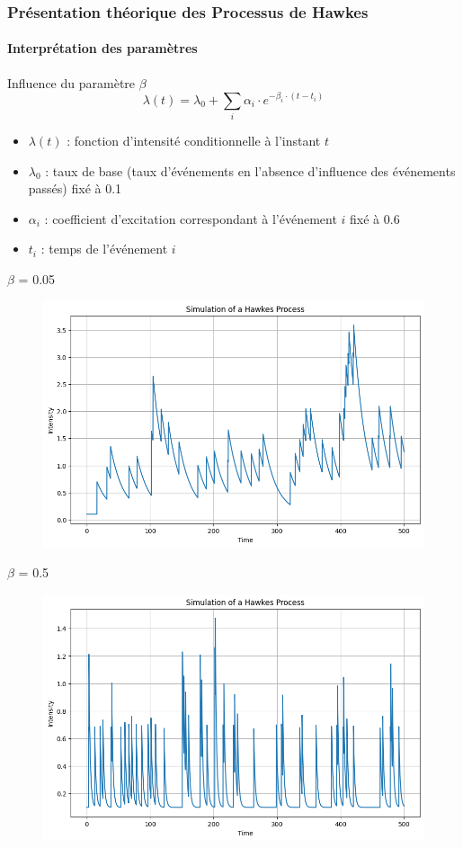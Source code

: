 \begin{frame}
    \frametitle{Présentation théorique des Processus de Hawkes}
    \framesubtitle{Interprétation des paramètres}

    \begin{block}{Influence du paramètre $\beta$ }
    \[ \lambda(t) = \lambda_0 + \sum_i \alpha_i \cdot e^{-\beta_i \cdot (t - t_i)} \]

    \begin{itemize}
            \item $\lambda(t)$ : fonction d'intensité conditionnelle à l'instant $t$
            \item $\lambda_0$ : taux de base (taux d'événements en l'absence d'influence des événements passés) fixé à 0.1
            \item $\alpha_i$ : coefficient d'excitation correspondant à l'événement $i$ fixé à 0.6
            \item $t_i$ : temps de l'événement $i$
        \end{itemize}

    \end{block}
\end{frame}
\begin{frame}
    \begin{block}{$\beta$ = 0.05}
    \begin{figure}[h]
        \centering
        \includegraphics[width=0.6\linewidth]{figures/beta1.png}
    \end{figure}
    \end{block}
\end{frame}

\begin{frame}
    \begin{block}{$\beta$ = 0.5}
    \begin{figure}[h]
        \centering
        \includegraphics[width=0.6\linewidth]{figures/beta2.png}
    \end{figure}
    \end{block}
\end{frame}

